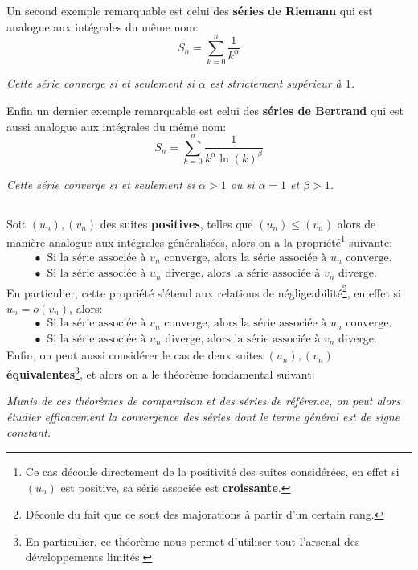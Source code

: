 Un second exemple remarquable est celui des \textbf{séries de Riemann} qui est analogue aux intégrales du même nom:
\[
   S_n = \sum_{k=0}^{n} \frac{1}{k^\alpha}
\]
\begin{center}
   \textit{Cette série converge si et seulement si \(\alpha\) est strictement supérieur à \(1\).}
\end{center}

Enfin un dernier exemple remarquable est celui des \textbf{séries de Bertrand} qui est aussi analogue aux intégrales du même nom:
\[
   S_n = \sum_{k=0}^{n} \frac{1}{k^\alpha \ln(k)^\beta}
\]
\begin{center}
   \textit{Cette série converge si et seulement si \(\alpha > 1\) ou si \(\alpha = 1\) et \(\beta > 1\).}
\end{center}
\subsection*{}
Soit \((u_n),(v_n)\) des suites \textbf{positives}, telles que \((u_n) \leq (v_n)\) alors de manière analogue aux intégrales généralisées, alors on a la propriété\footnote[1]{Ce cas découle directement de la positivité des suites considérées, en effet si \((u_n)\) est positive, sa série associée est \textbf{croissante}.} suivante:
\begin{align*}
   &\bullet \;\; \text{Si la série associée à \(v_n\) converge, alors la série associée à \(u_n\) converge.} \\
   &\bullet \;\; \text{Si la série associée à \(u_n\) diverge, alors la série associée à \(v_n\) diverge.}
\end{align*}
En particulier, cette propriété s'étend aux relations de négligeabilité\footnote[2]{Découle du fait que ce sont des majorations à partir d'un certain rang.}, en effet si \(u_n = o(v_n)\), alors:
\begin{align*}
   &\bullet \;\; \text{Si la série associée à \(v_n\) converge, alors la série associée à \(u_n\) converge.} \\
   &\bullet \;\; \text{Si la série associée à \(u_n\) diverge, alors la série associée à \(v_n\) diverge.}
\end{align*}
Enfin, on peut aussi considérer le cas de deux suites \((u_n), (v_n)\) \textbf{équivalentes}\footnote[3]{En particulier, ce théorème nous permet d'utiliser tout l'arsenal des développements limités.}, et alors on a le théorème fondamental suivant:
\begin{center}
   \textit{Munis de ces théorèmes de comparaison et des séries de référence, on peut alors étudier efficacement la convergence des séries dont le terme général est de signe constant.}
\end{center}
